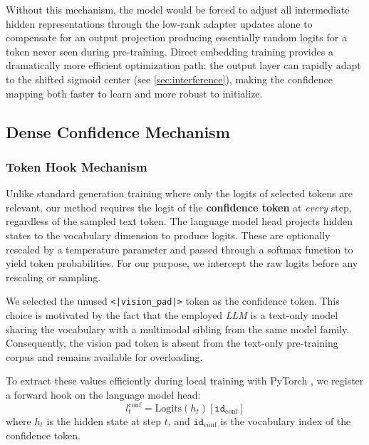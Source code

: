\documentclass[a4paper,oneside,10pt,ngerman,english]{scrartcl}
\begin{document}
Without this mechanism, the model would be forced to adjust all intermediate hidden representations through the low-rank adapter updates alone to compensate for an output projection producing essentially random logits for a token never seen during pre-training. Direct embedding training provides a dramatically more efficient optimization path: the output layer can rapidly adapt to the shifted sigmoid center (see \autoref{sec:interference}), making the confidence mapping both faster to learn and more robust to initialize.

\subsection{Dense Confidence Mechanism}

\subsubsection{Token Hook Mechanism}
Unlike standard generation training where only the logits of selected tokens are relevant, our method requires the logit of the \textbf{confidence token} at \textit{every} step, regardless of the sampled text token. The language model head projects hidden states to the vocabulary dimension to produce logits. These are optionally rescaled by a temperature parameter and passed through a softmax function to yield token probabilities. For our purpose, we intercept the raw logits before any rescaling or sampling.

We selected the unused \texttt{<|vision\_pad|>} token as the confidence token. This choice is motivated by the fact that the employed \textit{LLM} is a text-only model sharing the vocabulary with a multimodal sibling from the same model family. Consequently, the vision pad token is absent from the text-only pre-training corpus and remains available for overloading.

To extract these values efficiently during local training with PyTorch \citep{pytorch}, we register a forward hook on the language model head:
\begin{equation}
	l_{t}^{\mathrm{conf}} = \mathrm{Logits}(h_t)[\texttt{id}_{\mathrm{conf}}]
\end{equation}
where $h_t$ is the hidden state at step $t$, and $\texttt{id}_{\mathrm{conf}}$ is the vocabulary index of the confidence token.
\end{document}
